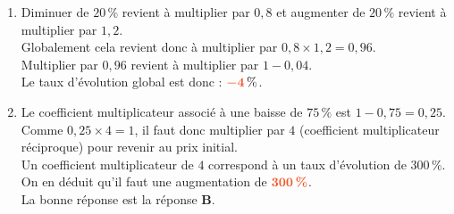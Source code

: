 \documentclass[a4paper,11pt]{article}
\newcounter{seancenum}
\begin{document}
\setcounter{seancenum}{9}
\newpage
\begin{seance}{} %
\begin{enumerate}
 \item Diminuer de $20\,\%$ revient à multiplier par $0{,}8$ et augmenter de $20\,\%$ revient à multiplier par $1{,}2$.\\
  Globalement cela revient donc à multiplier par $0{,}8\times 1{,}2=0{,}96$.\\
  Multiplier par $0{,}96$ revient à multiplier par  $1-0{,}04$. \\
          Le taux d'évolution global est donc : ${\color[HTML]{f15929}\boldsymbol{-4\,}} \%$.


\item Le coefficient multiplicateur associé à une baisse de $75\,\%$ est $1-0{,}75=0{,}25$.\\
    Comme $0{,}25\times 4=1$, il faut donc multiplier par $4$ (coefficient multiplicateur réciproque) pour revenir au prix initial.\\
      Un coefficient multiplicateur de $4$ correspond à un taux d'évolution de $300\,\%$.\\
      On en déduit qu'il faut une augmentation de ${\color[HTML]{f15929}\boldsymbol{300\,\%}}$.\\La bonne réponse est la réponse {\bfseries \color[HTML]{f15929}B}.



\end{enumerate}
\end{seance}
\end{document}
